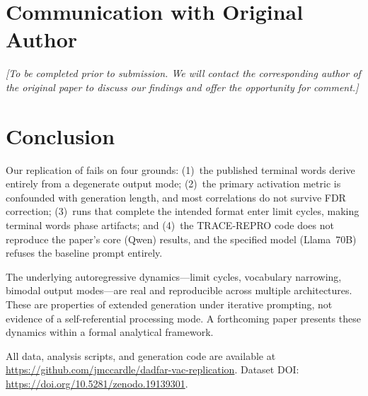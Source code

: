 \documentclass[11pt]{article}
\begin{document}
\section{Communication with Original Author}


\emph{[To be completed prior to submission. We will contact the
corresponding author of the original paper to discuss our findings
and offer the opportunity for comment.]}


\section{Conclusion}

Our replication of \citet{dadfar2026} fails on four grounds:
(1)~the published terminal words derive entirely from a degenerate
output mode;
(2)~the primary activation metric is confounded with generation
length, and most correlations do not survive FDR correction;
(3)~runs that complete the intended format enter limit cycles, making
terminal words phase artifacts; and
(4)~the TRACE-REPRO code does not reproduce the paper's core (Qwen)
results, and the specified model (Llama~70B) refuses the baseline prompt
entirely.

The underlying autoregressive dynamics---limit cycles, vocabulary
narrowing, bimodal output modes---are real and reproducible across
multiple architectures. These are properties of extended generation
under iterative prompting, not evidence of a self-referential
processing mode. A forthcoming paper presents these dynamics within a
formal analytical framework.

All data, analysis scripts, and generation code are available at
\url{https://github.com/jmccardle/dadfar-vac-replication}.
Dataset DOI: \url{https://doi.org/10.5281/zenodo.19139301}.




\end{document}
